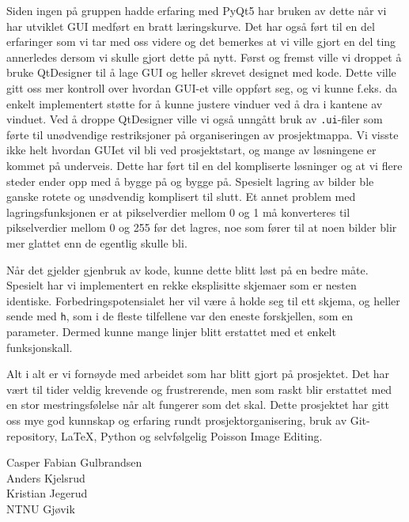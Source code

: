 Siden ingen på gruppen hadde erfaring med PyQt5 har bruken av dette når vi har utviklet GUI medført en bratt læringskurve. Det har også ført til en del erfaringer som vi tar med oss videre og det bemerkes at vi ville gjort en del ting annerledes dersom vi skulle gjort dette på nytt. Først og fremst ville vi droppet å bruke QtDesigner til å lage GUI og heller skrevet designet med kode. Dette ville gitt oss mer kontroll over hvordan GUI-et ville oppført seg, og vi kunne f.eks. da enkelt implementert støtte for å kunne justere vinduer ved å dra i kantene av vinduet. Ved å droppe QtDesigner ville vi også unngått bruk av \texttt{.ui}-filer som førte til unødvendige restriksjoner på organiseringen av prosjektmappa. Vi visste ikke helt hvordan GUIet vil bli ved prosjektstart, og mange av løsningene er kommet på underveis. Dette har ført til en del kompliserte løsninger og at vi flere steder ender opp med å bygge på og bygge på. Spesielt lagring av bilder ble ganske rotete og unødvendig komplisert til slutt. Et annet problem med lagringsfunksjonen er at pikselverdier mellom 0 og 1 må konverteres til pikselverdier mellom 0 og 255 før det lagres, noe som fører til at noen bilder blir mer glattet enn de egentlig skulle bli.

Når det gjelder gjenbruk av kode, kunne dette blitt løst på en bedre måte. Spesielt har vi implementert en rekke eksplisitte skjemaer som er nesten identiske. Forbedringspotensialet her vil være å holde seg til ett skjema, og heller sende med \texttt{h}, som i de fleste tilfellene var den eneste forskjellen, som en parameter. Dermed kunne mange linjer blitt erstattet med et enkelt funksjonskall. 

Alt i alt er vi fornøyde med arbeidet som har blitt gjort på prosjektet. Det har vært til tider veldig krevende og frustrerende, men som raskt blir erstattet med en stor mestringsfølelse når alt fungerer som det skal. Dette prosjektet har gitt oss mye god kunnskap og erfaring rundt prosjektorganisering, bruk av Git-repository, \LaTeX, Python og selvfølgelig Poisson Image Editing.

Casper Fabian Gulbrandsen\\
Anders Kjelsrud \\
Kristian Jegerud\\[0.4cm]
NTNU Gjøvik